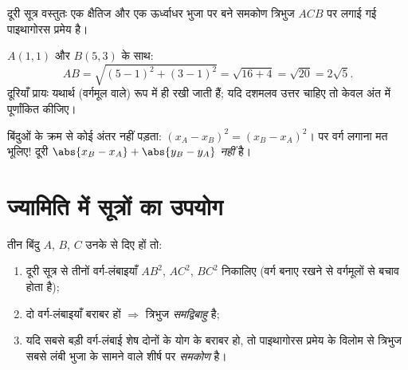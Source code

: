 \begin{omfigure}

{\small दूरी सूत्र वस्तुतः एक क्षैतिज और एक ऊर्ध्वाधर भुजा पर बने समकोण
त्रिभुज $ACB$ पर लगाई गई पाइथागोरस प्रमेय है।}
\end{omfigure}

\begin{example}\label{ex:g10:coordgeom:distance}
$A(1, 1)$ और $B(5, 3)$ के साथ:
\[
AB = \sqrt{(5-1)^2 + (3-1)^2} = \sqrt{16 + 4} = \sqrt{20} = 2\sqrt 5 .
\]
दूरियाँ प्रायः यथार्थ (वर्गमूल वाले) रूप में ही रखी जाती हैं; यदि दशमलव
उत्तर चाहिए तो केवल अंत में पूर्णांकित कीजिए।
\end{example}

\begin{remark}
बिंदुओं के क्रम से कोई अंतर नहीं पड़ता: $(x_A - x_B)^2 =
(x_B - x_A)^2$। पर वर्ग लगाना मत भूलिए! दूरी
$\abs{x_B - x_A} + \abs{y_B - y_A}$ \emph{नहीं} है।
\end{remark}

\section{ज्यामिति में सूत्रों का उपयोग}

\begin{method}[त्रिभुज की प्रकृति]\label{met:g10:coordgeom:triangle}
तीन बिंदु $A$, $B$, $C$ उनके  से दिए हों तो:
\begin{enumerate}
  \item दूरी सूत्र से तीनों वर्ग-लंबाइयाँ $AB^2$, $AC^2$, $BC^2$ निकालिए (वर्ग
        बनाए रखने से वर्गमूलों से बचाव होता है);
  \item दो वर्ग-लंबाइयाँ बराबर हों $\Rightarrow$ त्रिभुज \emph{समद्विबाहु} है;
  \item यदि सबसे बड़ी वर्ग-लंबाई शेष दोनों के योग के बराबर हो, तो पाइथागोरस
        प्रमेय के विलोम से त्रिभुज सबसे लंबी भुजा के सामने वाले शीर्ष पर
        \emph{समकोण} है।
\end{enumerate}
\end{method}

